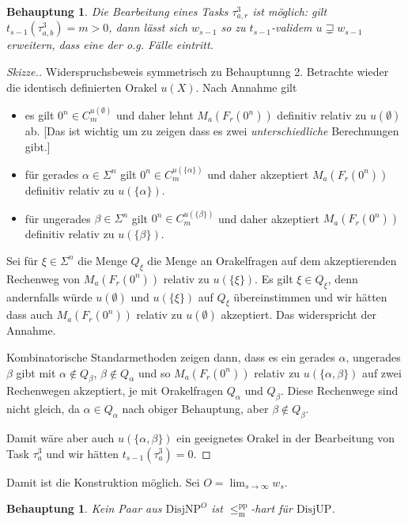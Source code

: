 \documentclass[nofonts]{uebung}
\newtheorem{claim}[theorem]{Behauptung}
\theoremstyle{definition}
\def\DisjNP{\ensuremath{\mathrm{DisjNP}}}
\def\DisjUP{\ensuremath{\mathrm{DisjUP}}}
\def\leqmpp{\ensuremath{\leq_\mathrm{m}^\mathrm{pp}}}
\begin{document}
\begin{claim}
    Die Bearbeitung eines Tasks $\tau^3_{a,r}$ ist möglich: gilt $t_{s-1}(\tau^3_{a,b})=m>0$, dann lässt sich $w_{s-1}$ so zu $t_{s-1}$-validem $u\sqsupsetneq w_{s-1}$ erweitern, dass eine der o.g. Fälle eintritt.
\end{claim}
\begin{proof}[Skizze.]
    Widerspruchsbeweis symmetrisch zu Behauptunng 2. Betrachte wieder die identisch definierten Orakel $u(X)$.
    Nach Annahme gilt
    \begin{itemize}
        \item es gilt $0^n\in C_m^{u(\emptyset)}$ und daher lehnt $M_a(F_r(0^n))$ definitiv relativ zu $u(\emptyset)$ ab. [Das ist wichtig um zu zeigen dass es zwei \emph{unterschiedliche} Berechnungen gibt.]
        \item für gerades $\alpha\in \Sigma^n$ gilt $0^n\in C_m^{u(\{\alpha\})}$ und daher akzeptiert $M_a(F_r(0^n))$ definitiv relativ zu $u(\{\alpha\})$.
        \item für ungerades $\beta\in \Sigma^n$ gilt $0^n\in C_m^{u(\{\beta\})}$ und daher akzeptiert $M_a(F_r(0^n))$ definitiv relativ zu $u(\{\beta\})$.
    \end{itemize}
    Sei für $\xi\in\Sigma^n$ die Menge $Q_\xi$ die Menge an Orakelfragen auf dem akzeptierenden Rechenweg von $M_a(F_r(0^n))$ relativ zu $u(\{\xi\})$.
    Es gilt $\xi\in Q_\xi$, denn andernfalls würde $u(\emptyset)$ und $u(\{\xi\})$ auf $Q_\xi$ übereinstimmen und wir hätten dass auch $M_a(F_r(0^n))$ relativ zu $u(\emptyset)$ akzeptiert. Das widerspricht der Annahme.

    Kombinatorische Standarmethoden zeigen dann, dass es ein gerades $\alpha$, ungerades $\beta$ gibt mit $\alpha\not\in Q_\beta$, $\beta\not\in Q_\alpha$ und so $M_a(F_r(0^n))$ relativ zu $u(\{\alpha,\beta\})$ auf zwei Rechenwegen akzeptiert, je mit Orakelfragen $Q_\alpha$ und $Q_\beta$. Diese Rechenwege sind nicht gleich, da $\alpha\in Q_\alpha$ nach obiger Behauptung, aber $\beta\not\in Q_\beta$.

    Damit wäre aber auch $u(\{\alpha,\beta\})$ ein geeignetes Orakel in der Bearbeitung von Task $\tau^3_{a}$ und wir hätten $t_{s-1}(\tau^3_{a})=0$.
\end{proof}

Damit ist die Konstruktion möglich. Sei $O=\lim_{s\to\infty} w_s$.

\begin{claim}
    Kein Paar aus $\DisjNP^O$ ist $\leqmpp$-hart für $\DisjUP$.
\end{claim}
\end{document}
